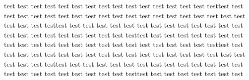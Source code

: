 test test test test test test test test test test test test test test test testtest test test test test test test test
test test test test test test test test test test test test test test test testtest test test test test test test test
test test test test test test test test test test test test test test test testtest test test test test test test test
test test test test test test test test test test test test test test test testtest test test test test test test test
test test test test test test test test test test test test test test test testtest test test test test test test test
test test test test test test test test test test test test test test test testtest test test test test test test test

